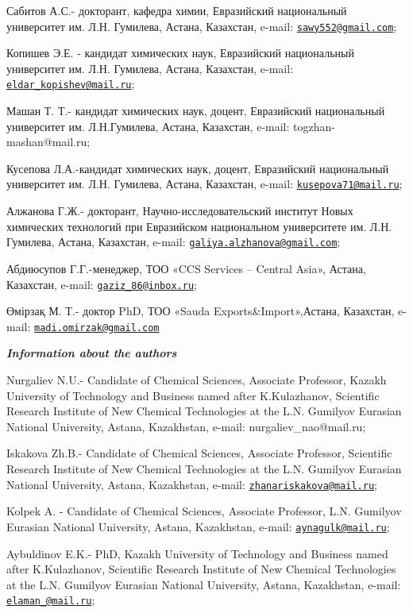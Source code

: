Сабитов А.С.- докторант, кафедра химии, Евразийский национальный
университет им. Л.Н. Гумилева, Астана, Казахстан, e-mail:
\href{mailto:sawy552@gmail.com}{\nolinkurl{sawy552@gmail.com}};

Копишев Э.Е. - кандидат химических наук, Евразийский национальный
университет им. Л.Н. Гумилева, Астана, Казахстан, e-mail:
\href{mailto:eldar_kopishev@mail.ru}{\nolinkurl{eldar\_kopishev@mail.ru}};

Машан Т. Т.- кандидат химических наук, доцент, Евразийский национальный
университет им. Л.Н.Гумилева, Астана, Казахстан, e-mail:
togzhan-mashan@mail.ru;

Кусепова Л.А.-кандидат химических наук, доцент, Евразийский национальный
университет им. Л.Н. Гумилева, Астана, Казахстан, e-mail:
\href{mailto:kusepova71@mail.ru}{\nolinkurl{kusepova71@mail.ru}};

Алжанова Г.Ж.- докторант, Научно-исследовательский институт Новых
химических технологий при Евразийском национальном университете им. Л.Н.
Гумилева, Астана, Казахстан, e-mail:
\href{mailto:galiya.alzhanova@gmail.com}{\nolinkurl{galiya.alzhanova@gmail.com}};

Абдиюсупов Г.Г.-менеджер, ТОО «CCS Services -- Central Asia», Астана,
Казахстан, e-mail:
\href{mailto:gaziz_86@inbox.ru}{\nolinkurl{gaziz\_86@inbox.ru}};

Өмірзақ М. Т.- доктор PhD, ТОО «Sauda Exports\&Import»,Астана,
Казахстан, e-mail:
\href{mailto:madi.omirzak@gmail.com}{\nolinkurl{madi.omirzak@gmail.com}}

\emph{{\bfseries Information about the authors}}

Nurgaliev N.U.- Candidate of Chemical Sciences, Associate Professor,
Kazakh University of Technology and Business named after K.Kulazhanov,
Scientific Research Institute of New Chemical Technologies at the L.N.
Gumilyov Eurasian National University, Astana, Kazakhstan, e-mail:
nurgaliev\_nao@mail.ru;

Iskakova Zh.B.- Candidate of Chemical Sciences, Associate Professor,
Scientific Research Institute of New Chemical Technologies at the L.N.
Gumilyov Eurasian National University, Astana, Kazakhstan, e-mail:
\href{mailto:zhanariskakova@mail.ru}{\nolinkurl{zhanariskakova@mail.ru}};

Kolpek A. - Candidate of Chemical Sciences, Associate Professor, L.N.
Gumilyov Eurasian National University, Astana, Kazakhstan, e-mail:
\href{mailto:aynagulk@mail.ru}{\nolinkurl{aynagulk@mail.ru}};

Aybuldinov E.K.- PhD, Kazakh University of Technology and Business named
after K.Kulazhanov, Scientific Research Institute of New Chemical
Technologies at the L.N. Gumilyov Eurasian National University, Astana,
Kazakhstan, e-mail:
\href{mailto:elaman_@mail.ru}{\nolinkurl{elaman\_@mail.ru}};

